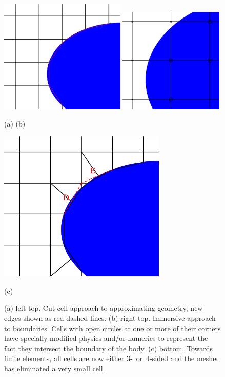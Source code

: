 \begin{figure}[h]
\centerline{\includegraphics[width=6cm]{../pics/meshd2}
\hspace{1cm}\includegraphics[width=5cm]{../pics/fdo}
}
\centerline{(a) \hspace{7cm}(b)}
\vspace{0.5cm}
\centerline{\includegraphics[width=8cm]{../pics/melde} }
\centerline{(c)}
\caption{(a) left top. Cut cell approach to approximating geometry, new edges shown as red dashed lines.
(b) right top.  Immersive approach to boundaries. Cells with open circles at one or more
of their corners have specially modified physics and/or numerics to represent
the fact they intersect the boundary of the body.
(c) bottom. Towards finite elements, all cells are now either $3$-~or~$4$-sided and the mesher
has eliminated a very small cell.
\label{fig:meshd2}}
\end{figure}
\clearpage
